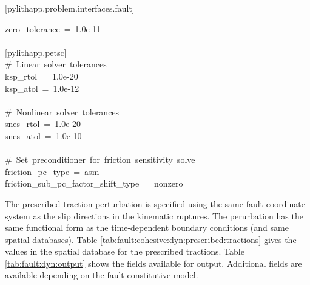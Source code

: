 \begin{lyxcode}
{[}pylithapp.problem.interfaces.fault{]}

zero\_tolerance~=~1.0e-11~\\
~\\
{[}pylithapp.petsc{]}~\\
\#~Linear~solver~tolerances~\\
ksp\_rtol~=~1.0e-20~\\
ksp\_atol~=~1.0e-12~\\
~\\
\#~Nonlinear~solver~tolerances~\\
snes\_rtol~=~1.0e-20~\\
snes\_atol~=~1.0e-10~\\
~\\
\#~Set~preconditioner~for~friction~sensitivity~solve~\\
friction\_pc\_type~=~asm~\\
friction\_sub\_pc\_factor\_shift\_type~=~nonzero
\end{lyxcode}
The prescribed traction perturbation is specified using the same fault
coordinate system as the slip directions in the kinematic ruptures.
The perurbation has the same functional form as the time-dependent
boundary conditions (and same spatial databases). Table \vref{tab:fault:cohesive:dyn:prescribed:tractions}
gives the values in the spatial database for the prescribed tractions.
Table \vref{tab:fault:dyn:output} shows the fields available for output.
Additional fields are available depending on the fault constitutive
model.

